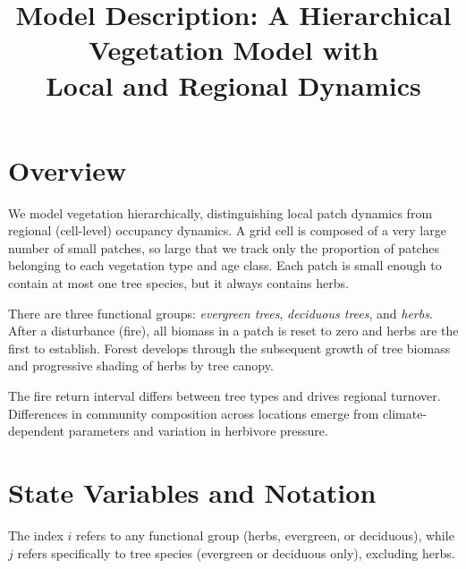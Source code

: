 \documentclass[12pt]{article}
\title{\textbf{Model Description: A Hierarchical Vegetation Model with\\
Local and Regional Dynamics}}
\author{}
\date{}
\begin{document}
\maketitle

\section{Overview}

We model vegetation hierarchically, distinguishing local patch dynamics from regional
(cell-level) occupancy dynamics. A grid cell is composed of a very large number of
small patches, so large that we track only the proportion of patches belonging to each
vegetation type and age class. Each patch is small enough to contain at most one tree
species, but it always contains herbs.

There are three functional groups: \textit{evergreen trees}, \textit{deciduous trees},
and \textit{herbs}. After a disturbance (fire), all biomass in a patch is reset to zero
and herbs are the first to establish. Forest develops through the subsequent growth of
tree biomass and progressive shading of herbs by tree canopy.

The fire return interval differs between tree types and drives regional turnover.
Differences in community composition across locations emerge from climate-dependent
parameters and variation in herbivore pressure.

\section{State Variables and Notation}

The index $i$ refers to any functional group (herbs, evergreen, or deciduous),
while $j$ refers specifically to tree species (evergreen or deciduous only),
excluding herbs.
\end{document}
